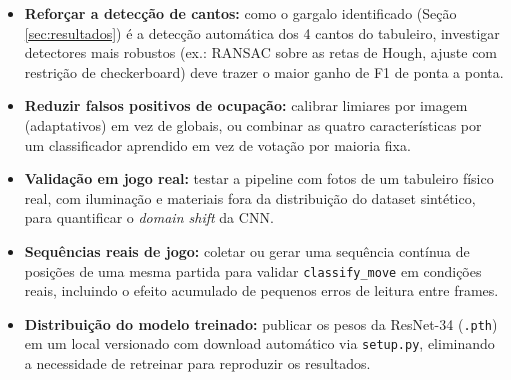 \begin{itemize}[nosep]
  \item \textbf{Reforçar a detecção de cantos:} como o gargalo identificado (Seção
        \ref{sec:resultados}) é a detecção automática dos 4 cantos do tabuleiro,
        investigar detectores mais robustos (ex.: RANSAC sobre as retas de Hough,
        ajuste com restrição de checkerboard) deve trazer o maior ganho de F1 de ponta
        a ponta.
  \item \textbf{Reduzir falsos positivos de ocupação:} calibrar limiares por imagem
        (adaptativos) em vez de globais, ou combinar as quatro características por um
        classificador aprendido em vez de votação por maioria fixa.
  \item \textbf{Validação em jogo real:} testar a pipeline com fotos de um tabuleiro
        físico real, com iluminação e materiais fora da distribuição do dataset
        sintético, para quantificar o \textit{domain shift} da CNN.
  \item \textbf{Sequências reais de jogo:} coletar ou gerar uma sequência contínua de
        posições de uma mesma partida para validar \texttt{classify\_move} em condições
        reais, incluindo o efeito acumulado de pequenos erros de leitura entre frames.
  \item \textbf{Distribuição do modelo treinado:} publicar os pesos da ResNet-34
        (\texttt{.pth}) em um local versionado com download automático via
        \texttt{setup.py}, eliminando a necessidade de retreinar para reproduzir os
        resultados.
\end{itemize}
